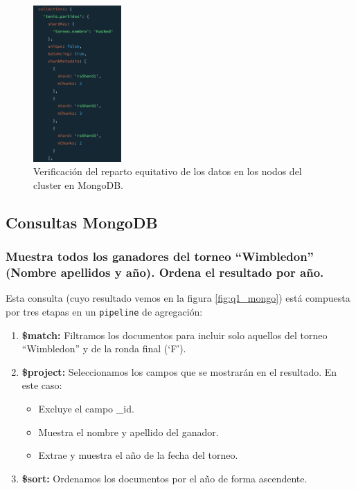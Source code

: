 \begin{figure}[H]
\centering
\includegraphics[width=0.3\textwidth]{fotos/mongo/chunks.png}
\caption{Verificación del reparto equitativo de los datos en los nodos del cluster en MongoDB.}
\label{fig:chunks}
\end{figure}




\newpage

\subsection{Consultas MongoDB}

\subsubsection{Muestra todos los ganadores del torneo ``Wimbledon'' (Nombre apellidos y año). Ordena el resultado por año.}

Esta consulta (cuyo resultado vemos en la figura \ref{fig:q1_mongo}) está compuesta por tres etapas en un \texttt{pipeline} de agregación:

\begin{enumerate}
    \item \textbf{\$match:} Filtramos los documentos para incluir solo aquellos del torneo ``Wimbledon'' y de la ronda final (`F').
    \item \textbf{\$project:} Seleccionamos los campos que se mostrarán en el resultado. En este caso:
    \begin{itemize}
        \item Excluye el campo \_id.
        \item Muestra el nombre y apellido del ganador.
        \item Extrae y muestra el año de la fecha del torneo.
    \end{itemize}
    
    \item \textbf{\$sort:} Ordenamos los documentos por el año de forma ascendente.
\end{enumerate}

